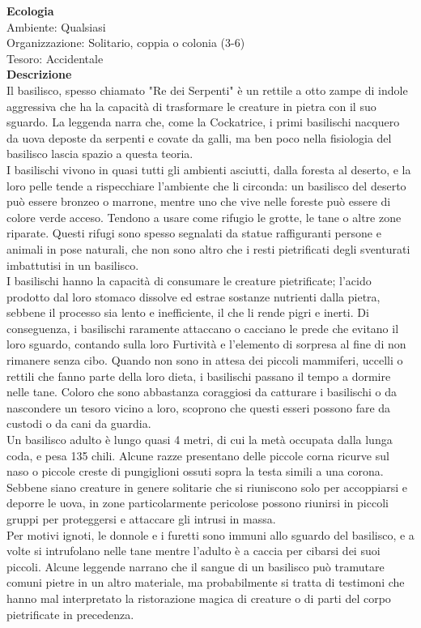 \begin{multicols}{2}
\textbf{Ecologia}\\
Ambiente: Qualsiasi\\
Organizzazione: Solitario, coppia o colonia (3-6)\\
Tesoro: Accidentale\\
\textbf{Descrizione}\\
Il basilisco, spesso chiamato "Re dei Serpenti" è un rettile a otto zampe di indole aggressiva che ha la capacità di trasformare le creature in pietra con il suo sguardo. La leggenda narra che, come la Cockatrice, i primi basilischi nacquero da uova deposte da serpenti e covate da galli, ma ben poco nella fisiologia del basilisco lascia spazio a questa teoria.\\
I basilischi vivono in quasi tutti gli ambienti asciutti, dalla foresta al deserto, e la loro pelle tende a rispecchiare l'ambiente che li circonda: un basilisco del deserto può essere bronzeo o marrone, mentre uno che vive nelle foreste può essere di colore verde acceso. Tendono a usare come rifugio le grotte, le tane o altre zone riparate. Questi rifugi sono spesso segnalati da statue raffiguranti persone e animali in pose naturali, che non sono altro che i resti pietrificati degli sventurati imbattutisi in un basilisco.\\
I basilischi hanno la capacità di consumare le creature pietrificate; l'acido prodotto dal loro stomaco dissolve ed estrae sostanze nutrienti dalla pietra, sebbene il processo sia lento e inefficiente, il che li rende pigri e inerti. Di conseguenza, i basilischi raramente attaccano o cacciano le prede che evitano il loro sguardo, contando sulla loro Furtività e l'elemento di sorpresa al fine di non rimanere senza cibo. Quando non sono in attesa dei piccoli mammiferi, uccelli o rettili che fanno parte della loro dieta, i basilischi passano il tempo a dormire nelle tane. Coloro che sono abbastanza coraggiosi da catturare i basilischi o da nascondere un tesoro vicino a loro, scoprono che questi esseri possono fare da custodi o da cani da guardia.\\
Un basilisco adulto è lungo quasi 4 metri, di cui la metà occupata dalla lunga coda, e pesa 135 chili. Alcune razze presentano delle piccole corna ricurve sul naso o piccole creste di pungiglioni ossuti sopra la testa simili a una corona. Sebbene siano creature in genere solitarie che si riuniscono solo per accoppiarsi e deporre le uova, in zone particolarmente pericolose possono riunirsi in piccoli gruppi per proteggersi e attaccare gli intrusi in massa.\\
Per motivi ignoti, le donnole e i furetti sono immuni allo sguardo del basilisco, e a volte si intrufolano nelle tane mentre l'adulto è a caccia per cibarsi dei suoi piccoli. Alcune leggende narrano che il sangue di un basilisco può tramutare comuni pietre in un altro materiale, ma probabilmente si tratta di testimoni che hanno mal interpretato la ristorazione magica di creature o di parti del corpo pietrificate in precedenza.\\



\end{multicols}
